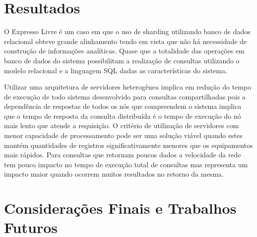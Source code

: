 \documentclass[12pt, a4paper]{article}
\begin{document}
\section{Resultados}

O Expresso Livre é um caso em que o uso de sharding utilizando banco de dados relacional obteve
grande alinhamento tendo em vista que não há necessidade de construção de informações analíticas.
Quase que a totalidade das operações em banco de dados do sistema possibilitam a realização
de consultas utilizando o modelo relacional e a linguagem SQL dadas as características do 
sistema.


Utilizar uma arquitetura de servidores heterogênea implica em redução do tempo de execução de todo
sistema desenvolvido para consultas compartilhadas pois a dependência de respostas de todos os
nós que compreendem o sistema implica que o tempo de resposta da consulta distribuída é o tempo
de execução do nó mais lento que atende a requisição. O critério de utilização de servidores 
com menor capacidade de processamento pode ser uma solução viável quando estes mantém quantidades
de registros significativamente menores que os equipamentos mais rápidos. Para consultas que
retornam poucos dados a velocidade da rede tem pouco impacto no tempo de execução total de
consultas mas representa um impacto maior quando ocorrem muitos resultados no retorno da mesma.

\section{Considerações Finais e Trabalhos Futuros}

{}
\end{document}
